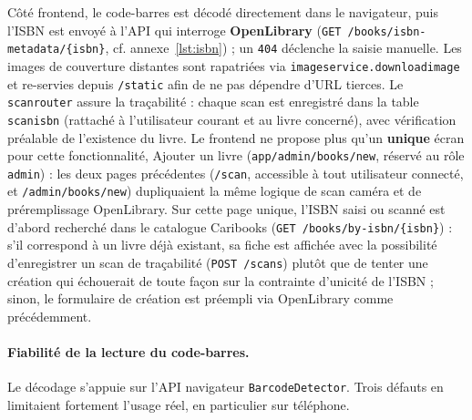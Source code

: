 \documentclass[12pt, a4paper]{report}
\renewcommand{\_}{\origunderscore\allowbreak}
\begin{document}
Côté frontend, le code-barres est décodé directement dans le navigateur, puis l'ISBN est envoyé à l'API qui interroge \textbf{OpenLibrary} (\texttt{GET /books/isbn-metadata/\{isbn\}}, cf. annexe~\ref{lst:isbn}) ; un \texttt{404} déclenche la saisie manuelle. Les images de couverture distantes sont rapatriées via \texttt{image\_service.download\_image} et re-servies depuis \texttt{/static} afin de ne pas dépendre d'URL tierces. Le \texttt{scan\_router} assure la traçabilité : chaque scan est enregistré dans la table \texttt{scan\_isbn} (rattaché à l'utilisateur courant et au livre concerné), avec vérification préalable de l'existence du livre. Le frontend ne propose plus qu'un \textbf{unique} écran pour cette fonctionnalité, \og Ajouter un livre \fg{} (\texttt{app/admin/books/new}, réservé au rôle \texttt{admin}) : les deux pages précédentes (\texttt{/scan}, accessible à tout utilisateur connecté, et \texttt{/admin/books/new}) dupliquaient la même logique de scan caméra et de préremplissage OpenLibrary. Sur cette page unique, l'ISBN saisi ou scanné est d'abord recherché dans le catalogue Caribooks (\texttt{GET /books/by-isbn/\{isbn\}}) : s'il correspond à un livre déjà existant, sa fiche est affichée avec la possibilité d'enregistrer un scan de traçabilité (\texttt{POST /scans}) plutôt que de tenter une création qui échouerait de toute façon sur la contrainte d'unicité de l'ISBN ; sinon, le formulaire de création est préempli via OpenLibrary comme précédemment.

\paragraph{Fiabilité de la lecture du code-barres.} Le décodage s'appuie sur l'API navigateur \texttt{BarcodeDetector}. Trois défauts en limitaient fortement l'usage réel, en particulier sur téléphone.
\end{document}
